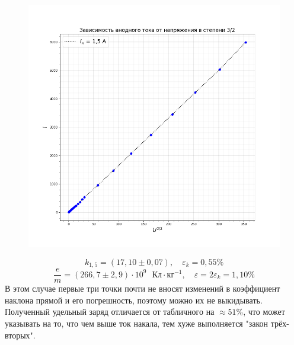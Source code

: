 \documentclass[a4paper,12pt]{article}
\begin{document}
\begin{figure}[H]\label{fig: I)(U^3/2) 1.5}
    \centering
    \includegraphics[width = \textwidth]{I(U pow (1,5))_15.png}
\end{figure}
\[k_{1,5} = (17,10 \pm 0,07), \quad \varepsilon_k = 0,55\% \]
\[\frac{e}{m} = (266,7 \pm 2,9) \cdot 10^{9} \text{ } Кл \cdot кг^{-1}, \quad \varepsilon = 2\varepsilon_k = 1,10\%\]
В этом случае первые три точки почти не вносят изменений в коэффициент наклона прямой и его погрешность, поэтому можно их не выкидывать. Полученный удельный заряд отличается от табличного на $\approx  51\%$, что может указывать на то, что чем выше ток накала, тем хуже выполняется "закон трёх-вторых".
\end{document}
